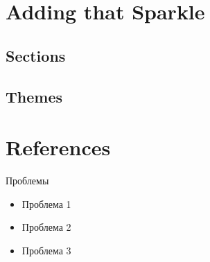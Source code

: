 \documentclass[14pt,pdf]{beamer}
\begin{document}
	\section[Sparkle]{Adding that Sparkle} \subsection{Sections} \subsection{Themes}
	\section*{References}

\begin{frame}{Проблемы}
	\begin{itemize}
		\item Проблема 1
		\item Проблема 2
		\item Проблема 3    
	\end{itemize}
\end{frame}
\end{document}
